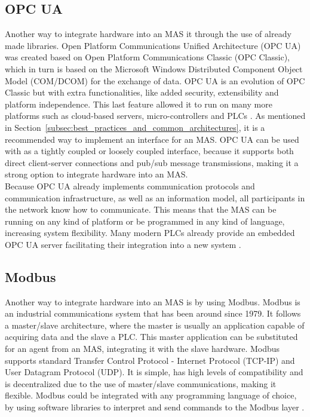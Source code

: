 \subsection{OPC UA}
\label{subsec:opcua}


Another way to integrate hardware into an MAS it through the use of already made libraries. Open Platform Communications Unified Architecture (OPC UA) was created based on Open Platform Communications Classic (OPC Classic), which in turn is based on the Microsoft Windows Distributed Component Object Model (COM/DCOM) for the exchange of data. OPC UA is an evolution of OPC Classic but with extra functionalities, like added security, extensibility and platform independence. This last feature allowed it to run on many more platforms such as cloud-based servers, micro-controllers and PLCs \cite{OPCUA_website}. As mentioned in Section~\ref{subsec:best_practices_and_common_architectures}, it is a recommended way to implement an interface for an MAS. OPC UA can be used with as a tightly coupled or loosely coupled interface, because it supports both direct client-server connections and pub/sub message transmissions, making it a strong option to integrate hardware into an MAS.\\

Because OPC UA already implements communication protocols and communication infrastructure, as well as an information model, all participants in the network know how to communicate. This means that the MAS can be running on any kind of platform or be programmed in any kind of language, increasing system flexibility. Many modern PLCs already provide an embedded OPC UA server facilitating their integration into a new system \cite{Seitz2021}.

\subsection{Modbus}

Another way to integrate hardware into an MAS is by using Modbus. Modbus is an industrial communications system that has been around since 1979. It follows a master/slave architecture, where the master is usually an application capable of acquiring data and the slave a PLC. This master application can be substituted for an agent from an MAS, integrating it with the slave hardware. Modbus supports standard Transfer Control Protocol - Internet Protocol (TCP-IP) and User Datagram Protocol (UDP). It is simple, has high levels of compatibility and is decentralized due to the use of master/slave communications, making it flexible. Modbus could be integrated with any programming language of choice, by using software libraries to interpret and send commands to the Modbus layer \cite{10084891}.
